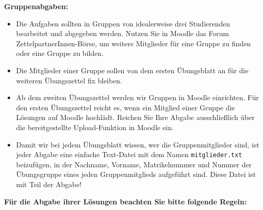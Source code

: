 \textbf{Gruppenabgaben:}

\begin{itemize}
    \item Die Aufgaben sollten in Gruppen von idealerweise drei Studierenden bearbeitet und abgegeben werden. Nutzen Sie in Moodle das Forum \glqq ZettelpartnerInnen-Börse\grqq{}, um weitere Mitglieder für eine Gruppe zu finden oder eine Gruppe zu bilden.

    \item Die Mitglieder einer Gruppe sollen von dem ersten Übungsblatt an für die weiteren Übungszettel fix bleiben. 

    \item Ab dem zweiten Übungszettel werden wir Gruppen in Moodle einrichten. Für den ersten Übungszettel reicht es, wenn ein Mitglied einer Gruppe die Lösungen auf Moodle hochlädt. Reichen Sie Ihre Abgabe ausschließlich über die bereitgestellte Upload-Funktion in Moodle ein. 

    \item Damit wir bei jedem Übungsblatt wissen, wer die Gruppenmitglieder sind, ist jeder Abgabe eine einfache Text-Datei mit dem Namen \texttt{mitglieder.txt} beizufügen, in der Nachname, Vorname, Matrikelnummer und Nummer der Übungsgruppe eines jeden Gruppenmitglieds aufgeführt sind. Diese Datei ist mit Teil der Abgabe!
\end{itemize}


\textbf{Für die Abgabe ihrer Lösungen beachten Sie bitte folgende Regeln:}

